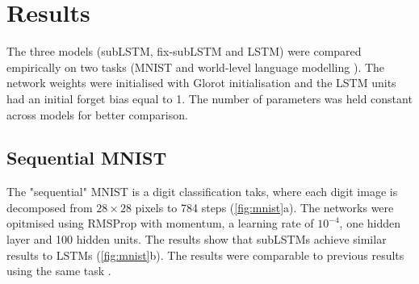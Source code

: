 \section{Results}
The three models (subLSTM, fix-subLSTM and LSTM) were compared empirically on two tasks (MNIST \cite{lecun-mnisthandwrittendigit-2010} and world-level language modelling \cite{marcus_1993, DBLP:journals/corr/MerityXBS16}). The network weights were initialised with Glorot initialisation \cite{Glorot10understandingthe} and the LSTM units had an initial forget bias equal to 1. The number of parameters was held constant across models for better comparison.

\subsection{Sequential MNIST}
The "sequential" MNIST is a digit classification taks, where each digit image is decomposed from $28 \times 28$ pixels to 784 steps (\figurename{\ref{fig:mnist}a}). The networks were opitmised using RMSProp with momentum, a learning rate of $10^{-4}$, one hidden layer and 100 hidden units. The results show that subLSTMs achieve similar results to LSTMs (\figurename{\ref{fig:mnist}b}). The results were comparable to previous results using the same task \cite{DBLP:journals/corr/LeJH15}.

